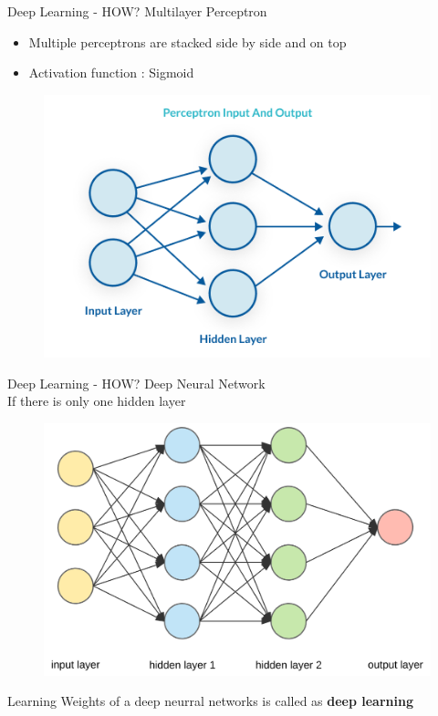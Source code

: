 \documentclass[10pt]{beamer}
\begin{document}
\begin{frame}[fragile]{Deep Learning - HOW?}
    Multilayer Perceptron
    \begin{itemize}
        \item Multiple perceptrons are stacked side by side and on top
\pause        
        \item Activation function : Sigmoid
    \end{itemize}
    \begin{figure}[ht]
      \hspace*{-1cm}\includegraphics[width=0.5\linewidth]{mlp}
    \end{figure}
\end{frame}

\begin{frame}[fragile]{Deep Learning - HOW?}
    Deep Neural Network \\ 
    If there is only one hidden layer
    \begin{figure}[ht]
      \hspace*{-1cm}\includegraphics[width=0.5\linewidth]{dnn}
    \end{figure}
Learning Weights of a deep neurral networks is called as \textbf{deep learning}
\end{frame}
\end{document}
